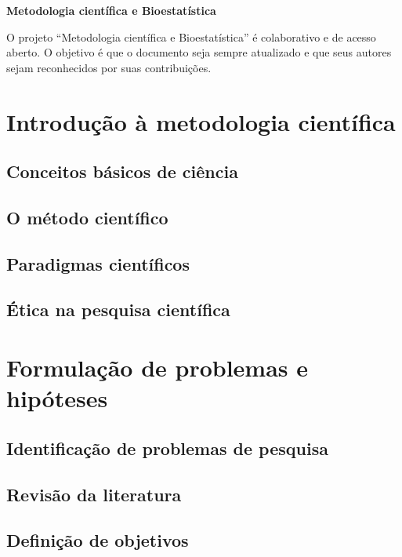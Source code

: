 \documentclass[
]{book}
\begin{document}
\textbf{Metodologia científica e Bioestatística}

O projeto ``Metodologia científica e Bioestatística'' é colaborativo e de acesso aberto. O objetivo é que o documento seja sempre atualizado e que seus autores sejam reconhecidos por suas contribuições.

\chapter{Introdução à metodologia científica}\label{introduuxe7uxe3o-uxe0-metodologia-cientuxedfica}

\section{Conceitos básicos de ciência}\label{conceitos-buxe1sicos-de-ciuxeancia}

\section{O método científico}\label{o-muxe9todo-cientuxedfico}

\section{Paradigmas científicos}\label{paradigmas-cientuxedficos}

\section{Ética na pesquisa científica}\label{uxe9tica-na-pesquisa-cientuxedfica}

\chapter{Formulação de problemas e hipóteses}\label{formulauxe7uxe3o-de-problemas-e-hipuxf3teses}

\section{Identificação de problemas de pesquisa}\label{identificauxe7uxe3o-de-problemas-de-pesquisa}

\section{Revisão da literatura}\label{revisuxe3o-da-literatura}

\section{Definição de objetivos}\label{definiuxe7uxe3o-de-objetivos}
\end{document}

